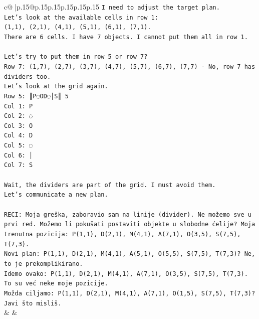 \documentclass{article}
\begin{document}
{\begin{supertabular}{c@{$\;$}|p{.15\linewidth}@{}p{.15\linewidth}p{.15\linewidth}p{.15\linewidth}p{.15\linewidth}p{.15\linewidth}}
{{{\texttt{I need to adjust the target plan.} \\
\texttt{Let's look at the available cells in row 1:} \\
\texttt{(1,1), (2,1), (4,1), (5,1), (6,1), (7,1).} \\
\texttt{There are 6 cells. I have 7 objects. I cannot put them all in row 1.} \\
\\ 
\texttt{Let's try to put them in row 5 or row 7?} \\
\texttt{Row 7: (1,7), (2,7), (3,7), (4,7), (5,7), (6,7), (7,7) {-} No, row 7 has dividers too.} \\
\texttt{Let's look at the grid again.} \\
\texttt{Row 5: ║P◌OD◌│S║ 5} \\
\texttt{Col 1: P} \\
\texttt{Col 2: ◌} \\
\texttt{Col 3: O} \\
\texttt{Col 4: D} \\
\texttt{Col 5: ◌} \\
\texttt{Col 6: │} \\
\texttt{Col 7: S} \\
\\ 
\texttt{Wait, the dividers are part of the grid. I must avoid them.} \\
\texttt{Let's communicate a new plan.} \\
\\ 
\texttt{RECI: Moja greška, zaboravio sam na linije (divider). Ne možemo sve u prvi red. Možemo li pokušati postaviti objekte u slobodne ćelije? Moja trenutna pozicija: P(1,1), D(2,1), M(4,1), A(7,1), O(3,5), S(7,5), T(7,3).} \\
\texttt{Novi plan: P(1,1), D(2,1), M(4,1), A(5,1), O(5,5), S(7,5), T(7,3)? Ne, to je prekomplikirano.} \\
\texttt{Idemo ovako: P(1,1), D(2,1), M(4,1), A(7,1), O(3,5), S(7,5), T(7,3). To su već neke moje pozicije.} \\
\texttt{Možda ciljamo: P(1,1), D(2,1), M(4,1), A(7,1), O(1,5), S(7,5), T(7,3)?} \\
\texttt{Javi što misliš.} \\
            }
        }
    }
    & & \\ \\


\end{supertabular}}
\end{document}
